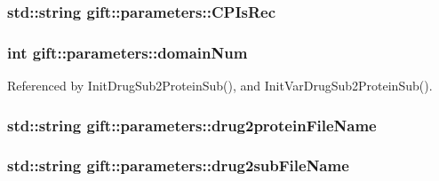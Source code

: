 \subsubsection[{\texorpdfstring{C\+P\+Is\+Rec}{CPIsRec}}]{\setlength{\rightskip}{0pt plus 5cm}std\+::string gift\+::parameters\+::\+C\+P\+Is\+Rec}\hypertarget{classgift_1_1parameters_a214614b3b837bf7755802764d2ce04c1}{}\label{classgift_1_1parameters_a214614b3b837bf7755802764d2ce04c1}
\subsubsection[{\texorpdfstring{domain\+Num}{domainNum}}]{\setlength{\rightskip}{0pt plus 5cm}int gift\+::parameters\+::domain\+Num}\hypertarget{classgift_1_1parameters_ae968d9a2aeb5742488810b3f7aa8b098}{}\label{classgift_1_1parameters_ae968d9a2aeb5742488810b3f7aa8b098}


Referenced by Init\+Drug\+Sub2\+Protein\+Sub(), and Init\+Var\+Drug\+Sub2\+Protein\+Sub().

\subsubsection[{\texorpdfstring{drug2protein\+File\+Name}{drug2proteinFileName}}]{\setlength{\rightskip}{0pt plus 5cm}std\+::string gift\+::parameters\+::drug2protein\+File\+Name}\hypertarget{classgift_1_1parameters_a61fc22423e89322e853c5eecebee3808}{}\label{classgift_1_1parameters_a61fc22423e89322e853c5eecebee3808}
\subsubsection[{\texorpdfstring{drug2sub\+File\+Name}{drug2subFileName}}]{\setlength{\rightskip}{0pt plus 5cm}std\+::string gift\+::parameters\+::drug2sub\+File\+Name}\hypertarget{classgift_1_1parameters_aa27081bc09725a965312c44ea26e4ba8}{}\label{classgift_1_1parameters_aa27081bc09725a965312c44ea26e4ba8}
